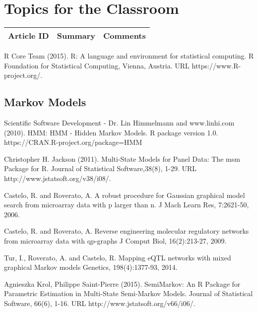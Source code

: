 \section{Topics for the Classroom}

\begin{table}[H]\centering
	\begin{tabular}{p{1cm}p{4cm}p{3cm}}
		Article ID & Summary & Comments\\
		\hline
		\hline
	\end{tabular}
\end{table}


\begin{thebibliography}{00}

R Core Team (2015). 
\newblock R: A language and environment for statistical computing. R Foundation for Statistical Computing, Vienna, Austria.
\newblock URL https://www.R-project.org/.

\subsection{Markov Models}

 Scientific Software Development - Dr. Lin Himmelmann and www.linhi.com (2010). 
\newblock HMM: HMM - Hidden Markov Models. 
\newblock R package version 1.0. https://CRAN.R-project.org/package=HMM

 Christopher H. Jackson (2011). 
\newblock Multi-State Models for Panel Data: The msm Package for R. 
\newblock Journal of Statistical Software,38(8), 1-29. URL http://www.jstatsoft.org/v38/i08/.

 Castelo, R. and Roverato, A. 
\newblock A robust procedure for Gaussian graphical model search from microarray data with p larger than n. 
\newblock J Mach Learn Res, 7:2621-50, 2006.

 Castelo, R. and Roverato, A. 
\newblock Reverse engineering molecular regulatory networks from microarray data with qp-graphs 
\newblock J Comput Biol, 16(2):213-27, 2009.

 Tur, I., Roverato, A. and Castelo, R. 
\newblock Mapping eQTL networks with mixed graphical Markov models 
\newblock Genetics, 198(4):1377-93, 2014.

 Agnieszka Krol, Philippe Saint-Pierre (2015). 
\newblock SemiMarkov: An R Package for Parametric Estimation in Multi-State Semi-Markov Models. 
\newblock Journal of Statistical Software, 66(6), 1-16. URL http://www.jstatsoft.org/v66/i06/.


\end{thebibliography}
